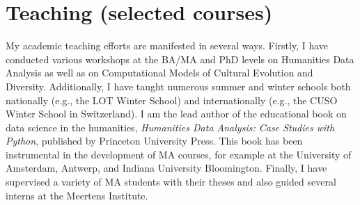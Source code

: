 \documentclass[12pt,letterpaper]{report}
\begin{document}
\section*{Teaching (selected courses)}
My academic teaching efforts are manifested in several ways. Firstly, I have
conducted various workshops at the BA/MA and PhD levels on Humanities Data
Analysis as well as on Computational Models of Cultural Evolution and Diversity.
Additionally, I have taught numerous summer and winter schools both nationally
(e.g., the LOT Winter School) and internationally (e.g., the CUSO Winter School
in Switzerland). I am the lead author of the educational book on data science in
the humanities, \emph{Humanities Data Analysis: Case Studies with Python},
published by Princeton University Press. This book has been instrumental in the
development of MA courses, for example at the University of Amsterdam, Antwerp,
and Indiana University Bloomington. Finally, I have supervised a variety of MA
students with their theses and also guided several interns at the Meertens
Institute.\\\vspace{0,5cm}
\end{document}
